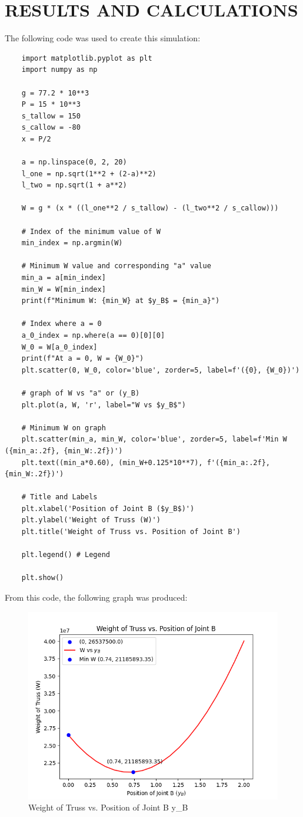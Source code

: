 \documentclass[12pt, a4paper]{article}
\begin{document}
\newpage
\section{RESULTS AND CALCULATIONS}

The following code was used to create this simulation:

\begin{lstlisting}
    import matplotlib.pyplot as plt
    import numpy as np

    g = 77.2 * 10**3
    P = 15 * 10**3
    s_tallow = 150 
    s_callow = -80
    x = P/2

    a = np.linspace(0, 2, 20)
    l_one = np.sqrt(1**2 + (2-a)**2)
    l_two = np.sqrt(1 + a**2)

    W = g * (x * ((l_one**2 / s_tallow) - (l_two**2 / s_callow)))

    # Index of the minimum value of W
    min_index = np.argmin(W)

    # Minimum W value and corresponding "a" value
    min_a = a[min_index]
    min_W = W[min_index]
    print(f"Minimum W: {min_W} at $y_B$ = {min_a}")

    # Index where a = 0
    a_0_index = np.where(a == 0)[0][0]
    W_0 = W[a_0_index]
    print(f"At a = 0, W = {W_0}")
    plt.scatter(0, W_0, color='blue', zorder=5, label=f'({0}, {W_0})')

    # graph of W vs "a" or (y_B)
    plt.plot(a, W, 'r', label="W vs $y_B$")

    # Minimum W on graph 
    plt.scatter(min_a, min_W, color='blue', zorder=5, label=f'Min W ({min_a:.2f}, {min_W:.2f})')
    plt.text((min_a*0.60), (min_W+0.125*10**7), f'({min_a:.2f}, {min_W:.2f})')

    # Title and Labels
    plt.xlabel('Position of Joint B ($y_B$)')
    plt.ylabel('Weight of Truss (W)')
    plt.title('Weight of Truss vs. Position of Joint B')

    plt.legend() # Legend

    plt.show()
\end{lstlisting}

From this code, the following graph was produced: 

\begin{figure}[H]
    \centering
    \includegraphics[width=0.8\linewidth]{graphresult.png}
    \caption{Weight of Truss vs. Position of Joint B y_B}
\end{figure}
\end{document}
